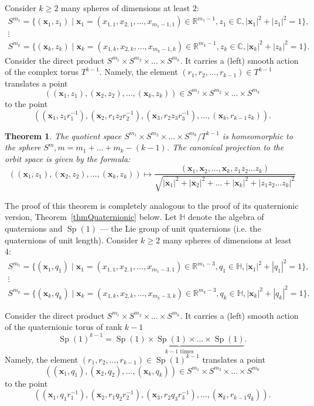 \documentclass[english, 12pt]{amsproc}
\newcounter{thcounter}
\numberwithin{equation}{section}
\theoremstyle{plain}
\newtheorem{thm}[thcounter]{Theorem}
\theoremstyle{definition}
\theoremstyle{remark}
\DeclareMathOperator{\Sp}{Sp}
\newcommand{\xb}{\mathbf{x}}
\newcommand{\Ro}{\mathbb{R}}
\newcommand{\Co}{\mathbb{C}}
\newcommand{\Ho}{\mathbb{H}}
\begin{document}
Consider $k\geqslant 2$ many spheres of dimensions at least $2$:
\begin{gather*}
S^{m_1} = \{ (\xb_1, z_1)\mid \xb_1 = (x_{1,1}, x_{2,1}, \ldots, x_{m_1-1,1}) \in \Ro^{m_1-1}, z_1\in \Co, |\xb_1|^2 + |z_1|^2 =1 \},\\
\vdots\\
S^{m_k} = \{ (\xb_k, z_k)\mid \xb_k = (x_{1,k}, x_{2,k}, \ldots, x_{m_k-1,k}) \in \Ro^{m_k-1}, z_k\in \Co, |\xb_k|^2 + |z_k|^2 =1 \}.
\end{gather*}
Consider the direct product $S^{m_1}\times S^{m_2}\times \ldots \times S^{m_k}$. It carries a (left) smooth action of the complex torus $T^{k-1}$. Namely, the element $(r_1,r_2,\ldots, r_{k-1})\in T^{k-1}$ translates a point
\[
((\xb_1, z_1), (\xb_2, z_2), \ldots, (\xb_k, z_k)) \in S^{m_1}\times S^{m_2}\times \ldots \times S^{m_k}
\]
to the point
\[
((\xb_1, z_1r_1^{-1}), (\xb_2, r_1z_2r_2^{-1}), (\xb_3, r_2z_3r_3^{-1}), \ldots, (\xb_k, r_{k-1}z_k)).
\]

\begin{thm}\label{thmComplex}
The quotient space $S^{m_1}\times S^{m_2}\times \ldots \times S^{m_k}/T^{k-1}$ is homeomorphic to the sphere $S^m, m = m_1+\ldots + m_k - (k-1)$. The canonical projection to the orbit space is given by the formula:
\begin{equation}\label{eqStar}
((\xb_1, z_1), (\xb_2, z_2), \ldots, (\xb_k, z_k)) \mapsto \frac{(\xb_1, \xb_2, \ldots, \xb_k, z_1z_2\ldots z_k)}{\sqrt{ |\xb_1|^2 + |\xb_2|^2 +  \ldots +  |\xb_k|^2 + |z_1z_2\ldots z_k|^2 }}
\end{equation}
\end{thm}

The proof of this theorem is completely analogous to the proof of its quaternionic version, Theorem~\ref{thmQuaternionic} below. Let $\Ho$ denote the algebra of quaternions and $\Sp(1)$ --- the Lie group of unit quaternions (i.e. the quaternions of unit length). Consider $k\geqslant 2$ many spheres of dimensions at least 4:
\begin{gather*}
S^{m_1} = \{ (\xb_1, q_1)\mid \xb_1 = (x_{1,1}, x_{2,1}, \ldots, x_{m_1-3,1}) \in \Ro^{m_1-3}, q_1\in \Ho, |\xb_1|^2 + |q_1|^2 =1 \}, \\
\vdots \\
S^{m_k} = \{ (\xb_k, q_k)\mid \xb_k = (x_{1,k}, x_{2,k}, \ldots, x_{m_k-3,k}) \in \Ro^{m_k-3}, q_k\in \Ho, |\xb_k|^2 + |q_k|^2 =1 \}.
\end{gather*}

Consider the direct product $S^{m_1}\times S^{m_2}\times \ldots \times S^{m_k}$. It carries a (left) smooth action of the quaternionic torus of rank $k-1$
\[
\Sp(1)^{k-1} = \underbrace{\Sp(1)\times \Sp(1)\times \ldots \times \Sp(1)}_{k-1 \text{ times}}.
\]
Namely, the element $(r_1,r_2,\ldots, r_{k-1})\in \Sp(1)^{k-1}$ translates a point
\[
((\xb_1, q_1), (\xb_2, q_2), \ldots, (\xb_k, q_k)) \in S^{m_1}\times S^{m_2}\times \ldots \times S^{m_k}
\]
to the point
\[
((\xb_1, q_1r_1^{-1}), (\xb_2, r_1q_2r_2^{-1}), (\xb_3, r_2q_3r_3^{-1}), \ldots, (\xb_k, r_{k-1}q_k)).
\]
\end{document}
